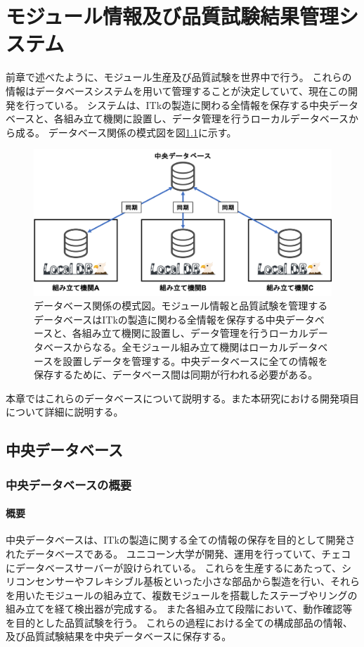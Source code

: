\chapter{モジュール情報及び品質試験結果管理システム}\label{chap:dbsystem}
前章で述べたように、モジュール生産及び品質試験を世界中で行う。
これらの情報はデータベースシステムを用いて管理することが決定していて、現在この開発を行っている。
システムは、ITkの製造に関わる全情報を保存する中央データベースと、各組み立て機関に設置し、データ管理を行うローカルデータベースから成る。
データベース関係の模式図を図\ref{database_overview}に示す。

\begin{figure}[bpt]\centering
\includegraphics[width=12cm]{./database_overview.png}
\caption[データベース関係の模式図]{データベース関係の模式図。モジュール情報と品質試験を管理するデータベースはITkの製造に関わる全情報を保存する中央データベースと、各組み立て機関に設置し、データ管理を行うローカルデータベースからなる。全モジュール組み立て機関はローカルデータベースを設置しデータを管理する。中央データベースに全ての情報を保存するために、データベース間は同期が行われる必要がある。}
\label{database_overview}
\end{figure}


本章ではこれらのデータベースについて説明する。また本研究における開発項目について詳細に説明する。

\section{中央データベース}
\subsection{中央データベースの概要}
\subsubsection{概要}
中央データベースは、ITkの製造に関する全ての情報の保存を目的として開発されたデータベースである。
ユニコーン大学\cite{4-9}が開発、運用を行っていて、チェコにデータベースサーバーが設けられている。
これらを生産するにあたって、シリコンセンサーやフレキシブル基板といった小さな部品から製造を行い、それらを用いたモジュールの組み立て、複数モジュールを搭載したステーブやリングの組み立てを経て検出器が完成する。
また各組み立て段階において、動作確認等を目的とした品質試験を行う。
これらの過程における全ての構成部品の情報、及び品質試験結果を中央データベースに保存する。

